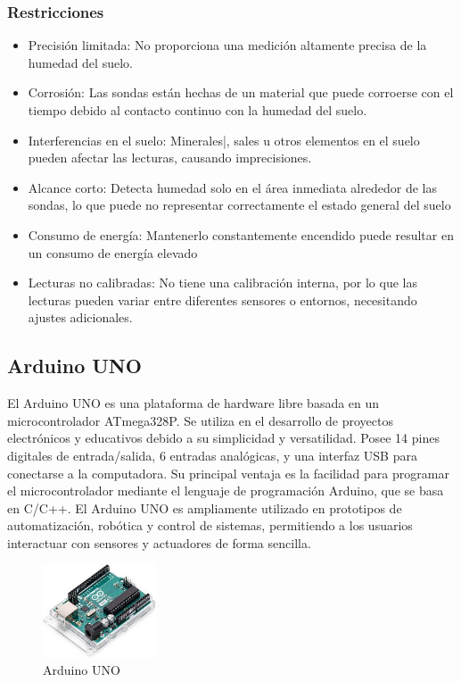 \documentclass[conference]{IEEEtran}
\begin{document}
	\subsubsection{Restricciones}
	\begin{itemize}
		\item Precisión limitada: No proporciona una medición altamente precisa de la humedad del suelo. 
		\item Corrosión: Las sondas están hechas de un material que puede corroerse con el tiempo debido al contacto continuo con la humedad del suelo.
		\item Interferencias en el suelo: Minerales|, sales u otros elementos en el suelo pueden afectar las lecturas, causando imprecisiones.
		\item Alcance corto: Detecta humedad solo en el área inmediata alrededor de las sondas, lo que puede no representar correctamente el estado general del suelo
		\item Consumo de energía: Mantenerlo constantemente encendido puede resultar en un consumo de energía elevado
		\item Lecturas no calibradas: No tiene una calibración interna, por lo que las lecturas pueden variar entre diferentes sensores o entornos, necesitando ajustes adicionales.
	\end{itemize}
	
	\subsection{Arduino UNO}
	El Arduino UNO es una plataforma de hardware libre basada en un microcontrolador ATmega328P. Se utiliza en el desarrollo de proyectos electrónicos y educativos debido a su simplicidad y versatilidad. Posee 14 pines digitales de entrada/salida, 6 entradas analógicas, y una interfaz USB para conectarse a la computadora. Su principal ventaja es la facilidad para programar el microcontrolador mediante el lenguaje de programación Arduino, que se basa en C/C++. El Arduino UNO es ampliamente utilizado en prototipos de automatización, robótica y control de sistemas, permitiendo a los usuarios interactuar con sensores y actuadores de forma sencilla.
	
	\begin{figure}[h]
		\centering
		\includegraphics[width=0.3\textwidth]{media/arduino-uno.jpg}
		\caption{Arduino UNO}
		\label{fig:arduino-uno}
	\end{figure}
	
\end{document}
